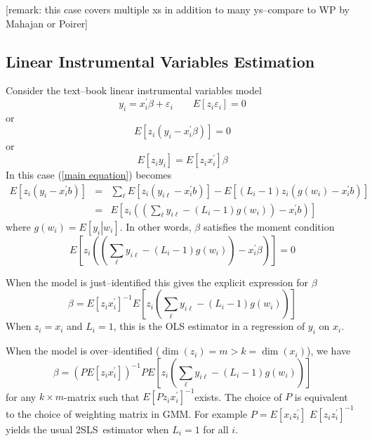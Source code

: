 \documentclass[12pt]{article}
\begin{document}
[remark: this case covers multiple xs in addition to many ys--compare to WP
by Mahajan or Poirer]

\subsection{Linear Instrumental Variables Estimation\label{Lin IV}}

Consider the text--book linear instrumental variables model
\begin{equation*}
y_{i}=x_{i}^{\prime }\beta +\varepsilon _{i}\qquad E\left[ z_{i}\varepsilon
_{i}\right] =0
\end{equation*}%
or%
\begin{equation}
E\left[ z_{i}\left( y_{i}-x_{i}^{\prime }\beta \right) \right] =0
\label{moment condition}
\end{equation}%
or%
\begin{equation*}
E\left[ z_{i}y_{i}\right] =E\left[ z_{i}x_{i}^{\prime }\right] \beta
\end{equation*}%
In this case (\ref{main equation}) becomes%
\begin{eqnarray*}
E\left[ z_{i}\left( y_{i}-x_{i}^{\prime }b\right) \right] &=&\sum_{\ell }E%
\left[ z_{i}\left( y_{i\ell }-x_{i}^{\prime }b\right) \right] -E\left[
\left( L_{i}-1\right) z_{i}\left( g\left( w_{i}\right) -x_{i}^{\prime
}b\right) \right] \\
&=&E\left[ z_{i}\left( \left( \sum_{\ell }y_{i\ell }-\left( L_{i}-1\right)
g\left( w_{i}\right) \right) -x_{i}^{\prime }b\right) \right]
\end{eqnarray*}%
where $g\left( w_{i}\right) =E\left[ \left. y_{i}\right\vert w_{i}\right] $.
In other words, $\beta $ satisfies the moment condition
\begin{equation}
E\left[ z_{i}\left( \left( \sum_{\ell }y_{i\ell }-\left( L_{i}-1\right)
g\left( w_{i}\right) \right) -x_{i}^{\prime }\beta \right) \right] =0
\label{momcon1}
\end{equation}

When the model is just--identified this gives the explicit expression for $%
\beta $%
\begin{equation}
\beta =E\left[ z_{i}x_{i}^{\prime }\right] ^{-1}E\left[ z_{i}\left(
\sum_{\ell }y_{i\ell }-\left( L_{i}-1\right) g\left( w_{i}\right) \right) %
\right]  \label{est1}
\end{equation}%
When $z_{i}=x_{i}$ and $L_{i}=1$, this is the OLS estimator in a regression
of $y_{i}$ on $x_{i}$.

When the model is over--identified ($\dim \left( z_{i}\right) =m>k=\dim
\left( x_{i}\right) $), we have%
\begin{equation}
\beta =\left( PE\left[ z_{i}x_{i}^{\prime }\right] \right) ^{-1}PE\left[
z_{i}\left( \sum_{\ell }y_{i\ell }-\left( L_{i}-1\right) g\left(
w_{i}\right) \right) \right]  \label{est2}
\end{equation}%
for any $k\times m$-matrix such that $E\left[ Pz_{i}x_{i}^{\prime }\right]
^{-1}$exists. The choice of $P$ is equivalent to the choice of weighting
matrix in GMM. For example $P=E\left[ x_{i}z_{i}^{\prime }\right] $ $E\left[
z_{i}z_{i}^{\prime }\right] ^{-1}$ yields the usual 2SLS\ estimator when $%
L_{i}=1$ for all $i$.
\end{document}
